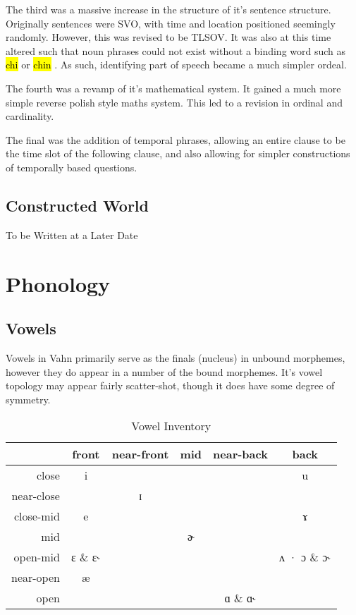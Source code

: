 \documentclass{article}
\newcommand{\hlv}[2][gray]{ {\sethlcolor{#1} \hl{#2}} }
\begin{document}
The third was a massive increase in the structure of it's sentence structure. Originally sentences
were SVO, with time and location positioned seemingly randomly. However, this was revised to be
TLSOV. It was also at this time altered such that noun phrases could not exist without a binding
word such as \hlv{chi} or \hlv{chin}. As such, identifying part of speech became a much simpler
ordeal.

The fourth was a revamp of it's mathematical system. It gained a much more simple reverse polish
style maths system. This led to a revision in ordinal and cardinality.

The final was the addition of temporal phrases, allowing an entire clause to be the time slot of the
following clause, and also allowing for simpler constructions of temporally based questions.

\subsection{Constructed World}

To be Written at a Later Date

\newpage
\section{Phonology}

\subsection{Vowels}

Vowels in Vahn primarily serve as the finals (nucleus) in unbound morphemes, however they do appear
in a number of the bound morphemes. It's vowel topology may appear fairly scatter-shot, though it
does have some degree of symmetry.

\begin{table}[H]
    \centering
    \begin{tabular}{r|ccccc}
        & front & near-front & mid & near-back & back \\
        \hline
        close & i & & & & u \\
        near-close & & ɪ & & & \\
        close-mid & e & & & & ɤ \\
        mid & & & ɚ & & \\
        open-mid & ɛ \& ɛ˞ & & & & ʌ · ɔ \& ɔ˞ \\
        near-open & æ & & & & \\
        open & & & & ɑ \& ɑ˞ & \\
    \end{tabular}
    \caption{Vowel Inventory}
    \label{Vowel Inventory}
\end{table}
\end{document}
